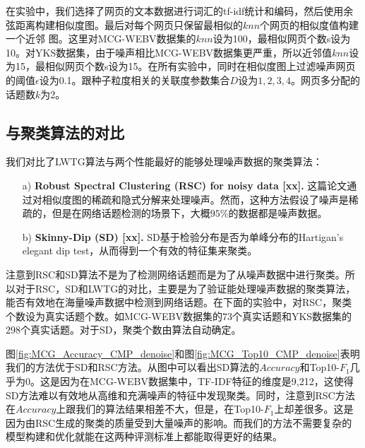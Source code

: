在实验中，我们选择了网页的文本数据进行词汇的tf-idf统计和编码，然后使用余弦距离构建相似度图。最后对每个网页只保留最相似的$knn$个网页的相似度值构建一个近邻
图。这里对MCG-WEBV数据集的$knn$设为100，最相似网页个数s设为10。对YKS数据集，由于噪声相比MCG-WEBV数据集更严重，所以近邻值$knn$设为15，最相似网页个数s设为15。在所有实验中，同时在相似度图上过滤噪声网页的阈值$\epsilon$设为0.1。跟种子粒度相关的关联度参数集合$D$设为${1,2,3,4}$。网页多分配的话题数$k$为2。

\subsection{与聚类算法的对比}

我们对比了LWTG算法与两个性能最好的能够处理噪声数据的聚类算法：
\begin{enumerate}
  \item[a)] \textbf{Robust Spectral Clustering (RSC) for noisy data [xx].} 这篇论文通过对相似度图的稀疏和隐式分解来处理噪声。然而，这种方法假设了噪声是稀疏的，但是在网络话题检测的场景下，大概$95\%$的数据都是噪声数据。
  \item[b)] \textbf{Skinny-Dip (SD) [xx].} SD基于检验分布是否为单峰分布的Hartigan’s elegant dip test，从而得到一个有效的特征集来聚类。
\end{enumerate}

注意到RSC和SD算法不是为了检测网络话题而是为了从噪声数据中进行聚类。所以对于RSC，SD和LWTG的对比，主要是为了验证能处理噪声数据的聚类算法，能否有效地在海量噪声数据中检测到网络话题。在下面的实验中，对RSC，聚类个数设为真实话题个数。如MCG-WEBV数据集的$73$个真实话题和YKS数据集的$298$个真实话题。对于SD，聚类个数由算法自动确定。

图\ref{fig:MCG_Accuracy_CMP_denoise}和图\ref{fig:MCG_Top10_CMP_denoise}表明我们的方法优于SD和RSC方法。从图中可以看出SD算法的$Accuracy$和Top10-$F_1$几乎为0。这是因为在MCG-WEBV数据集中，TF-IDF特征的维度是9,212，这使得SD方法难以有效地从高维和充满噪声的特征中发现聚类。同时，注意到RSC方法在$Accuracy$上跟我们的算法结果相差不大，但是，在Top10-$F_1$上却差很多。这是因为由RSC生成的聚类的质量受到大量噪声的影响。而我们的方法不需要复杂的模型构建和优化就能在这两种评测标准上都能取得更好的结果。

